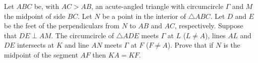 Let $ABC$ be, with $AC>AB$, an acute-angled triangle with circumcircle $\Gamma$ and $M$ the midpoint of side $BC$. Let $N$ be a point in the interior of $\bigtriangleup ABC$. Let $D$ and $E$ be the feet of the perpendiculars from $N$ to $AB$ and $AC$, respectively. Suppose that $DE\perp AM$. The circumcircle of $\bigtriangleup ADE$ meets $\Gamma$ at $L$ ($L\neq A$), lines $AL$ and $DE$ intersects at $K$ and line $AN$ meets $\Gamma$ at $F$ ($F\neq A$). Prove that if $N$ is the midpoint of the segment $AF$ then $KA=KF$.